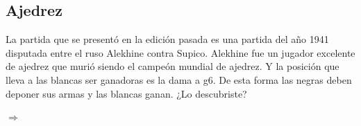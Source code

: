 \subsection{Ajedrez}
La partida que se presentó en la edición pasada es una partida del año 1941 disputada entre el ruso Alekhine contra Supico. Alekhine fue un jugador excelente de ajedrez que murió siendo el campeón mundial de ajedrez. Y la posición que lleva a las blancas ser ganadoras es la dama a g6. De esta forma las negras deben deponer sus armas y las blancas ganan. ¿Lo descubriste?
\newgame
{}
\tinyboard
\begin{center}
\showboard 
{} $\Rightarrow$
\showboard
\end{center}
\newpage





